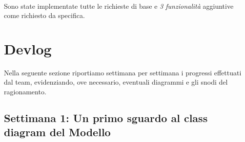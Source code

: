 \documentclass[a4paper, 12pt]{article}
\begin{document}
	\paragraph{}
	Sono state implementate tutte le richieste di base e \textit{3 funzionalità} aggiuntive come richiesto da specifica.
	
	\newpage
	\section{Devlog}
	\paragraph{}
	Nella seguente sezione riportiamo settimana per settimana i progressi effettuati dal team, evidenziando, ove necessario, eventuali diagrammi e gli snodi del ragionamento.
	\subsection{Settimana 1: Un primo sguardo al class diagram del Modello}
\end{document}
